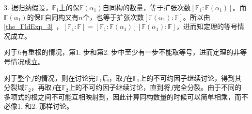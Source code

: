 3. 据归纳假设，$\mathbb{F}_1$上的保$\mathbb{F}(\alpha_1)$自同构的数量，等于扩张次数$[\mathbb{F}_1:\mathbb{F}(\alpha_1)]$。而$\mathbb{F}(\alpha_1)$的保$\mathbb{F}$自同构又有$n$个，也等于扩张次数$[\mathbb{F}(\alpha_1):\mathbb{F}]$。所以由\autoref{the_FldExp_3}~，$[\mathbb{F}_1:\mathbb{F}]=[\mathbb{F}_1:\mathbb{F}(\alpha_1)][\mathbb{F}(\alpha_1):\mathbb{F}]$，进而知定理的等号情况成立。

对于$h$有重根的情况，第1. 步和第2. 步中至少有一步不能取等号，进而定理的非等号情况成立。

对于整个$f$的情况，则在讨论完$\mathbb{F}_1$后，取$f$在$\mathbb{F}_1$上的不可约因子继续讨论，得到其分裂域$\mathbb{F}_2$，再取$f$在$\mathbb{F}_2$上的不可约因子继续讨论，直到将$f$完全分裂。由于不同的多项式的根之间不可能互相映射到，因此计算同构数量的时候可以简单相乘，而不必像1. 和2. 那样讨论。












